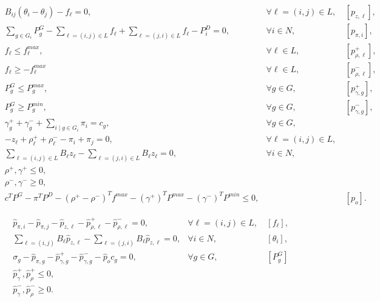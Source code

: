 \documentclass[10pt,a4paper]{amsart}
\begin{document}
\begin{align}
    &B_{ij} (\theta_i - \theta_j) - f_\ell =  0, &\forall \ell=(i,j) \in L, &~[p_{z,\ell}],\label{eq:cm:kvl}\\
    &\sum_{g \in G_i} P^G_g - \sum_{\ell = (i,j) \in L}f_\ell + \sum_{\ell = (j,i) \in L}f_\ell - P_i^D= 0, & \forall i \in N, &~[p_{\pi,i}],\label{eq:cm:fb}\\
    &f_\ell \leq f^{max}_\ell, & \forall \ell \in L,&~[p^+_{\rho,\ell}], \label{eq:cm:fp}\\
    &f_\ell \geq -f^{max}_\ell & \forall \ell \in L,&~[p^-_{\rho,\ell}], \label{eq:cm:fm}\\
    &P^G_g \leq P^{max}_g, & \forall g \in G, &~[p^+_{\gamma,g}],\\
    &P^G_g \geq P^{min}_g, & \forall g \in G, &~[p^-_{\gamma,g}],\\
    &\gamma^+_g + \gamma^-_g + \sum_{i \mid g \in G_i} \pi_i  = c_g, &\forall g \in G, \\
    &-z_\ell + \rho^+_\ell + \rho^-_\ell - \pi_i + \pi_j = 0, &\forall \ell=(i,j)\in L, \\
    &\sum_{\ell = (i,j) \in L} B_\ell z_\ell - \sum_{\ell = (j,i) \in L} B_\ell z_\ell = 0, &\forall i \in N, \\
    &\rho^+, \gamma^+ \leq 0, \\
    &\rho^-, \gamma^- \geq 0, \\
    &c^TP^G - \pi^T P^D - (\rho^+ - \rho^-)^Tf^{max} - (\gamma^+)^T P^{max} - (\gamma^-)^T P^{min} \le 0, &&~[p_o]. \label{eq:cm:opt}
\end{align}

    \begin{align}
        &\hat{p}_{\pi,i}-\hat{p}_{\pi,j}-\hat{p}_{z,\ell} - \hat{p}^+_{\rho,\ell} - \hat{p}^-_{\rho,\ell} =0 ,&\forall \ell=(i,j)\in L, &~[f_\ell], \label{eq:dual:f}\\
        &\sum_{\ell = (i,j)}B_{\ell} \hat{p}_{z,\ell}-\sum_{\ell = (j,i)}B_{\ell}  \hat{p}_{z,\ell} =0 ,&\forall i \in N, &~[\theta_i], \label{eq:dual:voltage} \\
        &\sigma_g-\hat{p}_{\pi,g}-\hat{p}^+_{\gamma,g}-\hat{p}^-_{\gamma,g}-\hat{p}_o c_g=0, &\forall g \in G, &~[P^G_g]\label{eq:dual:pg}\\
        &\hat{p}^+_{\gamma}, 
        \hat{p}^+_{\rho} \leq 0, \label{eq:dual:plus}\\
        &\hat{p}^-_{\gamma}, 
        \hat{p}^-_{\rho} \geq 0.\label{eq:dual:minus}
    \end{align}
\end{document}
